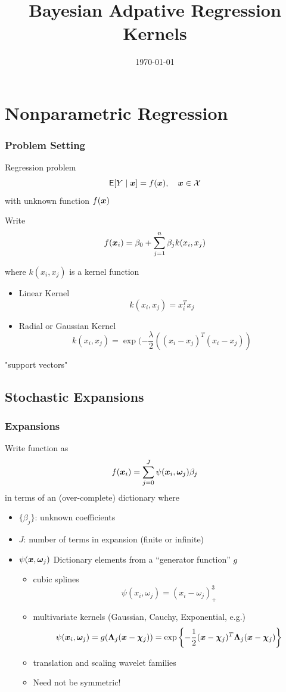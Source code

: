 \documentclass[]{beamer}\usepackage[]{graphicx}\usepackage[]{color}
\title{Bayesian Adpative Regression Kernels}
\date{\today}
\newcommand{\bs}[2]{\begin{frame} \frametitle{#1}
{#2}
\end{frame} }
\begin{document}
\begin{frame}
  \titlepage
\end{frame}




\section{Nonparametric Regression}


\bs{Problem Setting}{
Regression problem
$$ {\sf{E}}[Y \mid \bm x] = f(\bm x), \quad \bm x \in \mathcal{X}$$
with unknown function $f(\bm x)$ \pause

Write
$$f(\bm x_i) = \beta_0 + \sum_{j = 1}^n \beta_j k(x_i, x_j)
$$

where  $k(x_i, x_j)$ is a kernel function

\begin{itemize}
  \item Linear Kernel  $$ k(x_i, x_j) = x_i^Tx_j$$
  \item Radial or Gaussian Kernel $$k(x_i, x_j) = \exp(- \frac{\lambda}{2}( (x_i - x_j)^T (x_i - x_j))$$

\end{itemize}

"support vectors"




}

\subsection{Stochastic Expansions}
\bs{Expansions} {

Write function as
 $$f(\bm x_i) = \sum_{j=0}^{J}  \psi(\bm x_i, \bm \omega_j)\beta_j$$ in
terms of an (over-complete) dictionary where \pause

  \begin{itemize}
   \item  $\{\beta_j\}$:  unknown coefficients \pause
   \item  $J$: number of terms in expansion (finite or infinite) \pause


 \item $\psi(\bm x,\bm \omega_j)$   Dictionary elements from
a ``generator function'' $g$ \pause
  \begin{itemize}
  \item cubic splines
$$   \psi(x_i, \omega_j) =  (x_i - \omega_j)^3_+$$ \pause
  \item multivariate kernels  (Gaussian, Cauchy, Exponential, e.g.)
$$  \psi(\bm x_i, \bm \omega_j) =  g(
\bm \Lambda_j (\bm x - \bm \chi_j)) = \exp\left\{-\frac{1}{2}(\bm x - \bm \chi_j)^T \bm \Lambda_j (\bm x -
  \bm \chi_j)\right\}$$  \pause
  \item translation and scaling wavelet families  \pause

\item Need not be symmetric!
  \end{itemize}
  \end{itemize}


}
\end{document}
